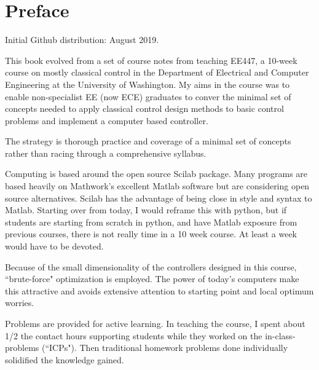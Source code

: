 \chapter*{Preface}

Initial Github distribution: August 2019. 
\vspace{0.25in}

This book evolved from a set of course notes from teaching EE447,
a 10-week course on mostly classical control
in the Department of Electrical and Computer Engineering at the University of Washington.
My aims in the course was to enable non-specialist EE (now ECE) graduates to 
conver the minimal set of concepts needed to apply 
classical control design methods to basic control problems and implement a computer
based controller. 

The strategy is thorough practice and coverage of a minimal set of concepts rather than 
racing through a comprehensive syllabus. 

Computing is based around the open source Scilab package.  Many programs are based heavily 
on Mathwork's excellent Matlab software but are considering open source alternatives.   
Scilab has the advantage of being close in style and syntax to Matlab.  Starting 
over from today, I would reframe this with python, but if students are starting from scratch
in python, and have Matlab exposure from previous courses, there is not really time 
in a 10 week course.   At least a week would have to be devoted.   

Because of the small dimensionality of the controllers designed in this course, ``brute-force" 
optimization is employed.  The power of today's computers make this attractive and avoids 
extensive attention to starting point and local optimum worries. 

Problems are provided for active learning.   In teaching the course, I spent about 1/2 the contact
hours supporting students while they worked on the in-class-problems (``ICPs").   Then traditional 
homework problems done individually solidified the knowledge gained. 

